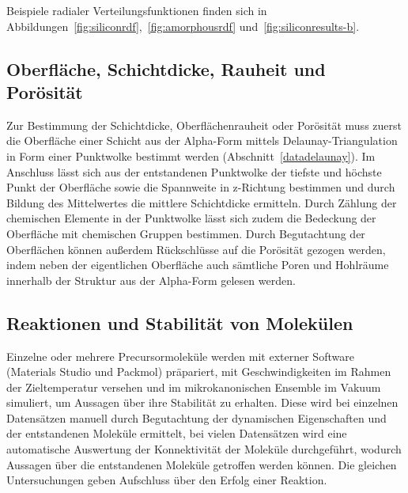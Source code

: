 Beispiele radialer Verteilungsfunktionen finden sich in Abbildungen~\ref{fig:siliconrdf},~\ref{fig:amorphousrdf} und~\ref{fig:siliconresults-b}.

\subsection{Oberfläche, Schichtdicke, Rauheit und Porösität}
\label{mdmethods-surface}

Zur Bestimmung der Schichtdicke, Oberflächenrauheit oder Porösität muss zuerst die Oberfläche einer Schicht aus der Alpha-Form mittels Delaunay-Triangulation in Form einer Punktwolke bestimmt werden (Abschnitt~\ref{datadelaunay}).
Im Anschluss lässt sich aus der entstandenen Punktwolke der tiefste und höchste Punkt der Oberfläche sowie die Spannweite in z-Richtung bestimmen und durch Bildung des Mittelwertes die mittlere Schichtdicke ermitteln.
Durch Zählung der chemischen Elemente in der Punktwolke lässt sich zudem die Bedeckung der Oberfläche mit chemischen Gruppen bestimmen.
Durch Begutachtung der Oberflächen können außerdem Rückschlüsse auf die Porösität gezogen werden, indem neben der eigentlichen Oberfläche auch sämtliche Poren und Hohlräume innerhalb der Struktur aus der Alpha-Form gelesen werden.

\subsection{Reaktionen und Stabilität von Molekülen}

Einzelne oder mehrere Precursormoleküle werden mit externer Software (Materials Studio\cite{biovia_materials_2014} und Packmol\cite{martinez_packmol:_2009}) präpariert, mit Geschwindigkeiten im Rahmen der Zieltemperatur versehen und im mikrokanonischen Ensemble im Vakuum simuliert, um Aussagen über ihre Stabilität zu erhalten.
Diese wird bei einzelnen Datensätzen manuell durch Begutachtung der dynamischen Eigenschaften und der entstandenen Moleküle ermittelt, bei vielen Datensätzen wird eine automatische Auswertung der Konnektivität der Moleküle durchgeführt, wodurch Aussagen über die entstandenen Moleküle getroffen werden können.
Die gleichen Untersuchungen geben Aufschluss über den Erfolg einer Reaktion.
